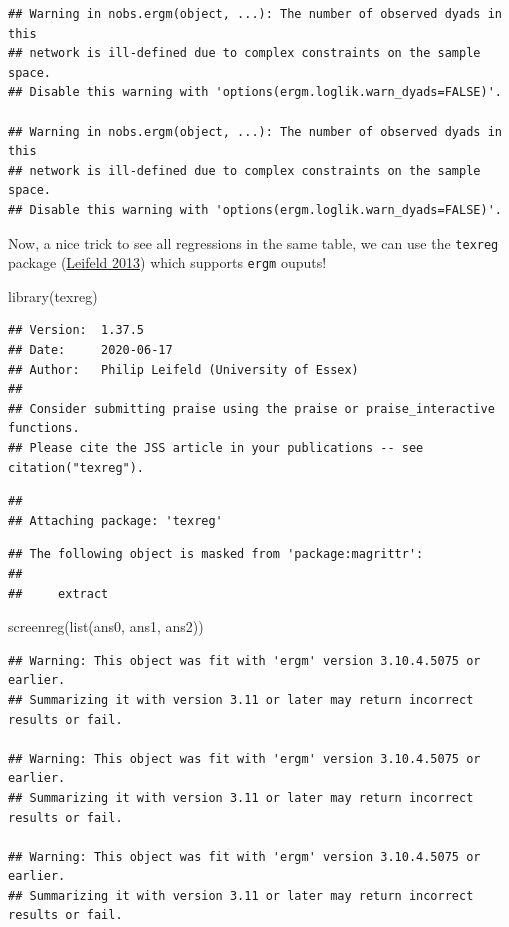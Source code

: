 \documentclass[
]{book}
\newenvironment{Shaded}{\begin{snugshade}}{\end{snugshade}}
\newcommand{\FunctionTok}[1]{\textcolor[rgb]{0.00,0.00,0.00}{#1}}
\newcommand{\NormalTok}[1]{#1}
\begin{document}
\begin{verbatim}
## Warning in nobs.ergm(object, ...): The number of observed dyads in this
## network is ill-defined due to complex constraints on the sample space.
## Disable this warning with 'options(ergm.loglik.warn_dyads=FALSE)'.

## Warning in nobs.ergm(object, ...): The number of observed dyads in this
## network is ill-defined due to complex constraints on the sample space.
## Disable this warning with 'options(ergm.loglik.warn_dyads=FALSE)'.
\end{verbatim}

Now, a nice trick to see all regressions in the same table, we can use the \texttt{texreg} package (\protect\hyperlink{ref-R-texreg}{Leifeld 2013}) which supports \texttt{ergm} ouputs!

\begin{Shaded}
\begin{Highlighting}[]
\FunctionTok{library}\NormalTok{(texreg)}
\end{Highlighting}
\end{Shaded}

\begin{verbatim}
## Version:  1.37.5
## Date:     2020-06-17
## Author:   Philip Leifeld (University of Essex)
## 
## Consider submitting praise using the praise or praise_interactive functions.
## Please cite the JSS article in your publications -- see citation("texreg").
\end{verbatim}

\begin{verbatim}
## 
## Attaching package: 'texreg'
\end{verbatim}

\begin{verbatim}
## The following object is masked from 'package:magrittr':
## 
##     extract
\end{verbatim}

\begin{Shaded}
\begin{Highlighting}[]
\FunctionTok{screenreg}\NormalTok{(}\FunctionTok{list}\NormalTok{(ans0, ans1, ans2))}
\end{Highlighting}
\end{Shaded}

\begin{verbatim}
## Warning: This object was fit with 'ergm' version 3.10.4.5075 or earlier.
## Summarizing it with version 3.11 or later may return incorrect results or fail.

## Warning: This object was fit with 'ergm' version 3.10.4.5075 or earlier.
## Summarizing it with version 3.11 or later may return incorrect results or fail.

## Warning: This object was fit with 'ergm' version 3.10.4.5075 or earlier.
## Summarizing it with version 3.11 or later may return incorrect results or fail.
\end{verbatim}
\end{document}

